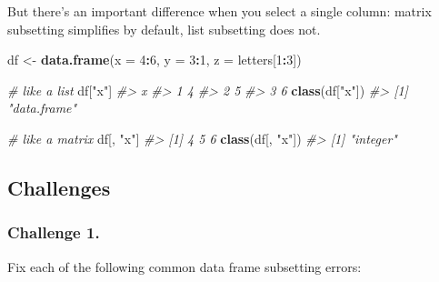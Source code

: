\documentclass[]{book}
\newenvironment{Shaded}{\begin{snugshade}}{\end{snugshade}}
\newcommand{\CommentTok}[1]{\textcolor[rgb]{0.56,0.35,0.01}{\textit{#1}}}
\newcommand{\DataTypeTok}[1]{\textcolor[rgb]{0.13,0.29,0.53}{#1}}
\newcommand{\DecValTok}[1]{\textcolor[rgb]{0.00,0.00,0.81}{#1}}
\newcommand{\KeywordTok}[1]{\textcolor[rgb]{0.13,0.29,0.53}{\textbf{#1}}}
\newcommand{\NormalTok}[1]{#1}
\newcommand{\OperatorTok}[1]{\textcolor[rgb]{0.81,0.36,0.00}{\textbf{#1}}}
\newcommand{\StringTok}[1]{\textcolor[rgb]{0.31,0.60,0.02}{#1}}
\begin{document}
But there's an important difference when you select a single column: matrix subsetting simplifies by default, list subsetting does not.

\begin{Shaded}
\begin{Highlighting}[]
\NormalTok{df <-}\StringTok{ }\KeywordTok{data.frame}\NormalTok{(}\DataTypeTok{x =} \DecValTok{4}\OperatorTok{:}\DecValTok{6}\NormalTok{, }\DataTypeTok{y =} \DecValTok{3}\OperatorTok{:}\DecValTok{1}\NormalTok{, }\DataTypeTok{z =}\NormalTok{ letters[}\DecValTok{1}\OperatorTok{:}\DecValTok{3}\NormalTok{])}

\CommentTok{# like a list}
\NormalTok{df[}\StringTok{"x"}\NormalTok{]}
\CommentTok{#>   x}
\CommentTok{#> 1 4}
\CommentTok{#> 2 5}
\CommentTok{#> 3 6}
\KeywordTok{class}\NormalTok{(df[}\StringTok{"x"}\NormalTok{])}
\CommentTok{#> [1] "data.frame"}

\CommentTok{# like a matrix}
\NormalTok{df[, }\StringTok{"x"}\NormalTok{]}
\CommentTok{#> [1] 4 5 6}
\KeywordTok{class}\NormalTok{(df[, }\StringTok{"x"}\NormalTok{])}
\CommentTok{#> [1] "integer"}
\end{Highlighting}
\end{Shaded}

\hypertarget{challenges-9}{%
\subsection{Challenges}\label{challenges-9}}

\hypertarget{challenge-1.-4}{%
\subsubsection*{Challenge 1.}\label{challenge-1.-4}}

Fix each of the following common data frame subsetting errors:

\begin{Shaded}
\end{Shaded}
\end{document}
